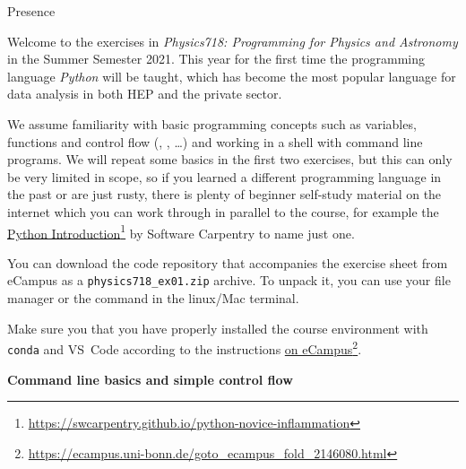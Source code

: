 \documentclass[a4paper, draft=False]{scrartcl}
\begin{document}


\begin{exam}[Presence]{Presence}
  \begin{instructions}[Introduction]

    Welcome to the exercises in \emph{Physics718: Programming for Physics and Astronomy} in
    the Summer Semester 2021. This year for the first time the programming
    language \emph{Python} will be taught, which has become the most popular
    language for data analysis in both HEP and the private sector.

    We assume familiarity with basic programming concepts such as variables,
    functions and control flow (, , \ldots) and working in a
    shell with command line programs. We will repeat some basics in the first
    two exercises, but this can only be very limited in scope, so if you learned
    a different programming language in the past or are just rusty, there is
    plenty of beginner self-study material on the internet which you can work
    through in parallel to the course, for example the
    \href{https://swcarpentry.github.io/python-novice-inflammation}{Python
      Introduction}\footnote{%
      \url{https://swcarpentry.github.io/python-novice-inflammation}} by
    Software Carpentry to name just one.
  \end{instructions}

  \begin{instructions}

    You can download the code repository that accompanies the exercise sheet
    from eCampus as a \texttt{physics718\_ex01.zip} archive. To unpack it, you can use
    your file manager or the  command in the linux/Mac terminal.
  \end{instructions}

  \begin{instructions}

   Make sure you that you have properly installed the course environment with
   \texttt{conda} and VS~Code according to the instructions
   \href{https://ecampus.uni-bonn.de/goto_ecampus_fold_2146080.html}{%
     on eCampus}\footnote{%
     \url{https://ecampus.uni-bonn.de/goto_ecampus_fold_2146080.html}}.

    \begin{problem*}\textbf{Command line basics and simple control flow}


\end{problem*}
\end{instructions}
\end{exam}
\end{document}
